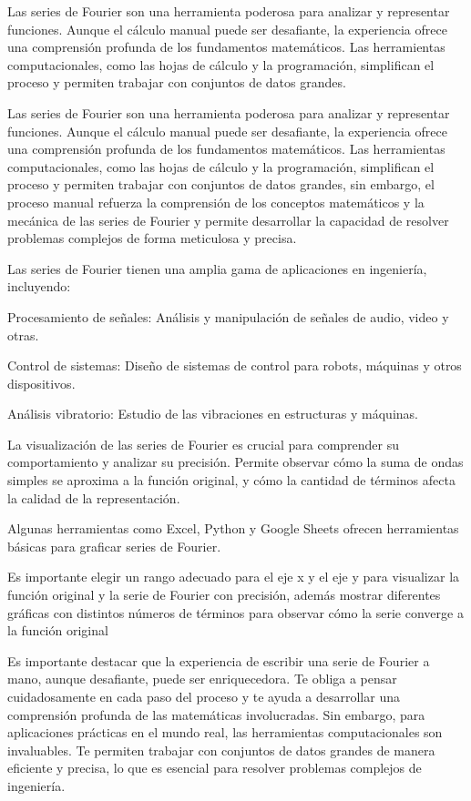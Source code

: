 Las series de Fourier son una herramienta poderosa para analizar y representar funciones. Aunque el cálculo manual puede ser desafiante, la experiencia ofrece una comprensión profunda de los fundamentos matemáticos. Las herramientas computacionales, como las hojas de cálculo y la programación, simplifican el proceso y permiten trabajar con conjuntos de datos grandes.

Las series de Fourier son una herramienta poderosa para analizar y representar funciones. Aunque el cálculo manual puede ser desafiante, la experiencia ofrece una comprensión profunda de los fundamentos matemáticos. Las herramientas computacionales, como las hojas de cálculo y la programación, simplifican el proceso y permiten trabajar con conjuntos de datos grandes, sin embargo, el proceso manual refuerza la comprensión de los conceptos matemáticos y la mecánica de las series de Fourier y permite desarrollar la capacidad de resolver problemas complejos de forma meticulosa y precisa.

Las series de Fourier tienen una amplia gama de aplicaciones en ingeniería, incluyendo:

Procesamiento de señales: Análisis y manipulación de señales de audio, video y otras.

Control de sistemas: Diseño de sistemas de control para robots, máquinas y otros dispositivos.

Análisis vibratorio: Estudio de las vibraciones en estructuras y máquinas.

La visualización de las series de Fourier es crucial para comprender su comportamiento y analizar su precisión. Permite observar cómo la suma de ondas simples se aproxima a la función original, y cómo la cantidad de términos afecta la calidad de la representación.

Algunas herramientas como Excel, Python y Google Sheets ofrecen herramientas básicas para graficar series de Fourier.

Es importante elegir un rango adecuado para el eje x y el eje y para visualizar la función original y la serie de Fourier con precisión, además mostrar diferentes gráficas con distintos números de términos para observar cómo la serie converge a la función original

Es importante destacar que la experiencia de escribir una serie de Fourier a mano, aunque desafiante, puede ser enriquecedora. Te obliga a pensar cuidadosamente en cada paso del proceso y te ayuda a desarrollar una comprensión profunda de las matemáticas involucradas. Sin embargo, para aplicaciones prácticas en el mundo real, las herramientas computacionales son invaluables. Te permiten trabajar con conjuntos de datos grandes de manera eficiente y precisa, lo que es esencial para resolver problemas complejos de ingeniería.

